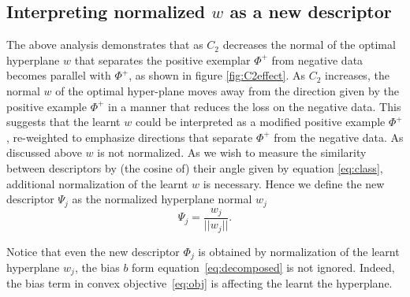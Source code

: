 \documentclass[10pt,twocolumn,letterpaper]{article}
\begin{document}
   \subsection{Interpreting normalized $w$ as a new descriptor} %
      The above analysis demonstrates that as $C_2$ decreases the normal of the optimal hyperplane $w$ that separates the positive exemplar $\Phi^+$ from negative data becomes parallel with $\Phi^+$, as shown in figure \ref{fig:C2effect}. As $C_2$ increases, the normal $w$ of the optimal hyper-plane moves away from the direction given by the positive example $\Phi^+$ in a manner that reduces the loss on the negative data. 
      This suggests that the learnt $w$ could be interpreted as a modified positive example $\Phi^+$, re-weighted to emphasize directions that separate $\Phi^+$ from the negative data. As discussed above $w$ is not normalized. As we wish to measure the similarity between descriptors by (the cosine of) their angle given by equation \eqref{eq:class}, additional normalization of the learnt $w$ is necessary. Hence we define the new descriptor $\Psi_j$ as the normalized hyperplane normal $w_j$
         \begin{equation}
            \label{eq:normalization}
            \Psi_j=\dfrac{w_j}{||w_j||}.
         \end{equation}

      \textcolor{petr}{%
         Notice that even the new descriptor $\Phi_j$ is obtained by normalization of the learnt hyperplane $w_j$, the bias $b$ form equation~\eqref{eq:decomposed} is not ignored. Indeed, the bias term in convex objective~\eqref{eq:obj} is affecting the learnt the hyperplane.
      }
\end{document}
